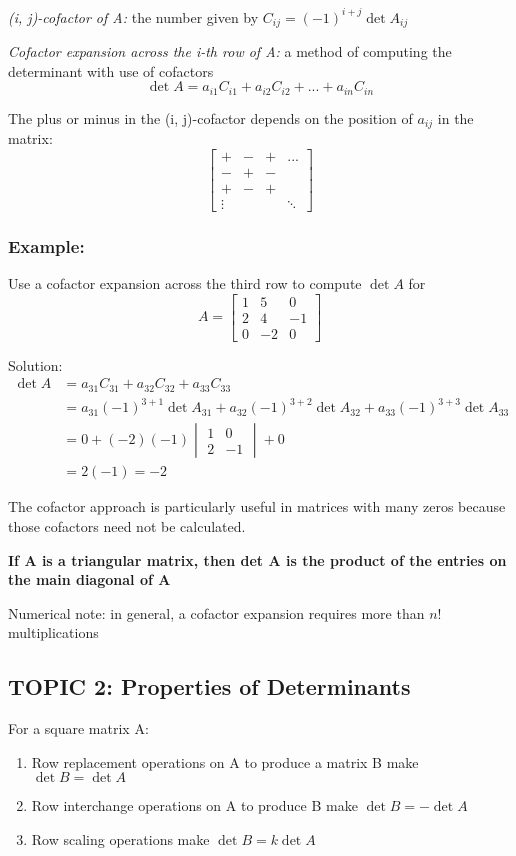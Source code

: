 \documentclass[12pt]{article} %
\begin{document}
\emph{(i, j)-cofactor of A:} the number given by $C_{ij} = (-1)^{i + j} \det A_{ij}$

\emph{Cofactor expansion across the i-th row of A:} a method of computing the determinant with use of cofactors 
$$\det A = a_{i1} C_{i1} + a_{i2} C_{i2} + ... + a_{in} C_{in}$$

The plus or minus in the (i, j)-cofactor depends on the position of $a_{ij}$ in the matrix:
$$\begin{bmatrix}
	+ & - & + & ...\\
	- & + & - & \\
	+ & - & + & \\
	\vdots & & & \ddots
\end{bmatrix}$$

\subsubsection{Example:} Use a cofactor expansion across the third row to compute $\det A$ for 
$$A = \begin{bmatrix}
	1 & 5 & 0\\
	2 & 4 & -1\\
	0 & -2 & 0
\end{bmatrix}$$

Solution:
\begin{align*}
	\det A &= a_{31} C_{31} + a_{32} C_{32} + a_{33} C_{33}\\
	&= a_{31} (-1)^{3 + 1} \det A_{31} +  a_{32} (-1)^{3 + 2} \det A_{32} +  a_{33} (-1)^{3 + 3} \det A_{33}\\
	&= 0 + (-2)(-1)\begin{vmatrix}
		1 & 0\\
		2 & -1
	\end{vmatrix} + 0\\
	&= 2(-1) = -2
\end{align*}

The cofactor approach is particularly useful in matrices with many zeros because those cofactors need not be calculated.

\textbf{If A is a triangular matrix, then det A is the product of the entries on the main diagonal of A}

Numerical note: in general, a cofactor expansion requires more than $n!$ multiplications

\subsection{TOPIC 2: Properties of Determinants}
For a square matrix A:
\begin{enumerate}
	\item Row replacement operations on A to produce a matrix B make $\det B = \det A$
	\item Row interchange operations on A to produce B make $\det B = -\det A$
	\item Row scaling operations make $\det B = k\det A$
\end{enumerate}
\end{document}

